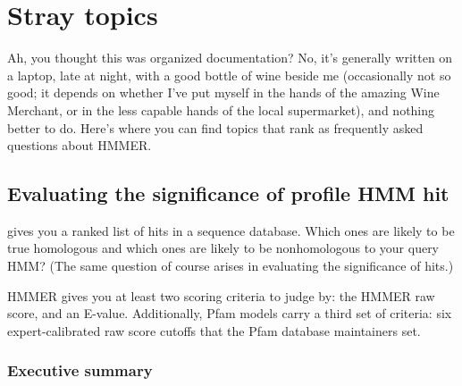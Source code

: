 \chapter{Stray topics}

Ah, you thought this was organized documentation? No, it's generally
written on a laptop, late at night, with a good bottle of wine beside
me (occasionally not so good; it depends on whether I've put myself in
the hands of the amazing Wine Merchant, or in the less capable hands
of the local supermarket), and nothing better to do. Here's where you
can find topics that rank as frequently asked questions about HMMER.

\section{Evaluating the significance of profile HMM hit}

 gives you a ranked list of hits in a sequence
database.  Which ones are likely to be true homologous and which ones
are likely to be nonhomologous to your query HMM? (The same
question of course arises in evaluating the significance of
 hits.)

HMMER gives you at least two scoring criteria to judge by: the HMMER
raw score, and an E-value. Additionally, Pfam models carry a third set
of criteria: six expert-calibrated raw score cutoffs that the Pfam
database maintainers set.

\subsection{Executive summary}


